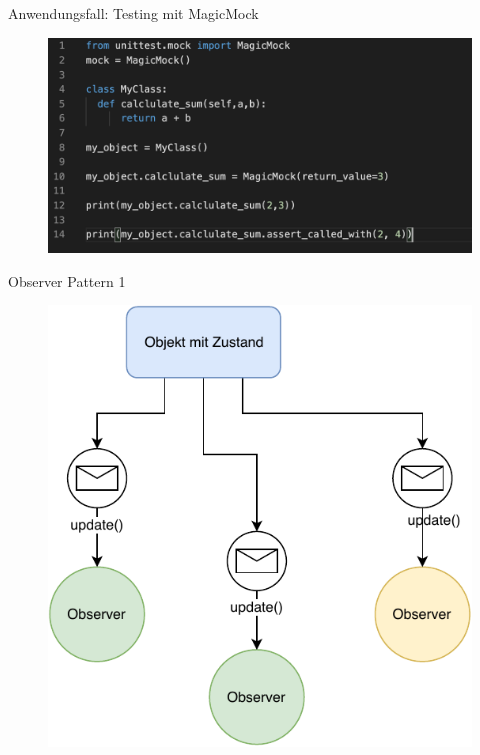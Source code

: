 \begin{frame}{Anwendungsfall: Testing mit MagicMock}
   \begin{figure}[!htb]
        \includegraphics[scale=0.47]{07-python3/img/magicmock}
    \end{figure}

\end{frame}

\begin{frame}{Observer Pattern 1}
       \begin{figure}[!htb]
        \includegraphics[scale=0.67]{07-python3/img/observer}
    \end{figure}

\end{frame}

